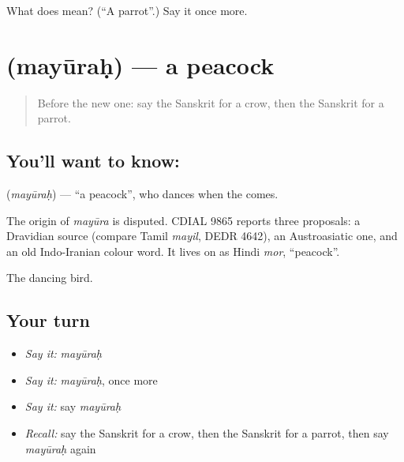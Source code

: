 \begin{tcolorbox}[breakable,colback=teal!4,colframe=teal!35!black,title={Before you move on}]
What does  mean? (\textquotedblleft{}A parrot\textquotedblright{}.) Say it once more.
\end{tcolorbox}
\section[\texorpdfstring{\sk{मयूरः} (mayūraḥ)}{मयूरः (mayūraḥ)}]{ (mayūraḥ) — a peacock}

\label{lesson:SA-C80-peacock}



\begin{quote}
Before the new one: say the Sanskrit for a crow, then the Sanskrit for a parrot.
\end{quote}

\subsection*{You'll want to know: }
\textbf{} (\emph{mayūraḥ}) — \textquotedblleft{}a peacock\textquotedblright{}, who dances when the \textbf{} comes.

\begin{cousinweb}
The origin of \emph{mayūra} is disputed. CDIAL 9865 reports three proposals: a Dravidian source (compare Tamil \emph{mayil}, DEDR 4642), an Austroasiatic one, and an old Indo-Iranian colour word. It lives on as Hindi \emph{mor}, \textquotedblleft{}peacock\textquotedblright{}.
\end{cousinweb}

\begin{grammarlens}[title={What you've built}]
The dancing bird.
\end{grammarlens}

\subsection*{Your turn}
\begin{itemize}
\raggedright
  \item \emph{Say it:} \emph{mayūraḥ}
  \item \emph{Say it:} \emph{mayūraḥ}, once more
  \item \emph{Say it:} say \emph{mayūraḥ}
  \item \emph{Recall:} say the Sanskrit for a crow, then the Sanskrit for a parrot, then say \emph{mayūraḥ} again
\end{itemize}

